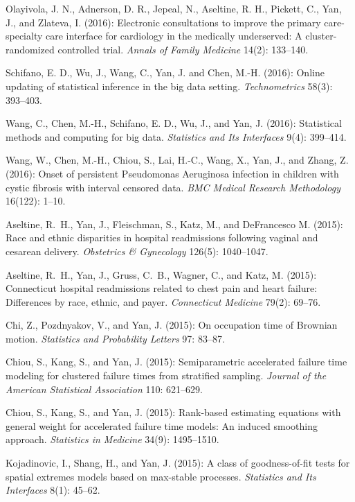 \documentclass[Statistics]{vita}
\begin{document}
\begin{vita}
\begin{Publications}
\begin{RefereedJournalArticles}
  \item Olayivola, J. N., Adnerson, D. R., Jepeal, N., Aseltine, R. H., Pickett, C., Yan, J., and Zlateva, I. (2016): Electronic consultations to improve the primary care-specialty care interface for cardiology in the medically underserved: A cluster-randomized controlled trial. {\em Annals of Family Medicine\/} 14(2): 133--140.
  \item Schifano, E. D., Wu, J., Wang, C., Yan, J. and Chen, M.-H. (2016): Online updating of statistical inference in the big data setting. {\em Technometrics\/} 58(3): 393--403.
  \item *Wang, C., Chen, M.-H., Schifano, E. D., Wu, J., and Yan, J. (2016): Statistical methods and computing for big data. {\em Statistics and Its Interfaces\/} 9(4): 399--414.
  \item *Wang, W., Chen, M.-H., Chiou, S., Lai, H.-C., Wang, X., Yan, J., and Zhang, Z. (2016): Onset of persistent Pseudomonas Aeruginosa infection in children with cystic fibrosis with interval censored data. {\em BMC Medical Research Methodology\/} 16(122): 1--10.
  \item Aseltine, R.~H., Yan, J., Fleischman, S., Katz, M., and DeFrancesco M. (2015): Race and ethnic disparities in hospital readmissions following vaginal and cesarean delivery. {\em Obstetrics \& Gynecology\/} 126(5): 1040--1047.
  \item Aseltine, R.~H., Yan, J., Gruss, C.~B., Wagner, C., and Katz, M. (2015): Connecticut hospital readmissions related to chest pain and heart failure: {D}ifferences by race, ethnic, and payer. {\em Connecticut Medicine\/} 79(2):  69--76.
  \item Chi, Z., Pozdnyakov, V., and Yan, J. (2015): On occupation time of Brownian motion. {\em Statistics and Probability Letters\/} 97: 83--87.
  \item *Chiou, S., Kang, S., and Yan, J. (2015): Semiparametric accelerated failure time modeling for clustered failure times from stratified sampling. {\em Journal of the American Statistical Association\/} 110: 621--629.
  \item *Chiou, S., Kang, S., and Yan, J. (2015): Rank-based estimating equations with general weight for accelerated failure time models: An induced smoothing approach. {\em Statistics in Medicine\/} 34(9): 1495--1510.
  \item Kojadinovic, I., Shang, H., and Yan, J. (2015): A class of goodness-of-fit tests for spatial extremes models based on max-stable processes. {\em Statistics and Its Interfaces\/} 8(1): 45--62.

\end{RefereedJournalArticles}
\end{Publications}
\end{vita}
\end{document}
